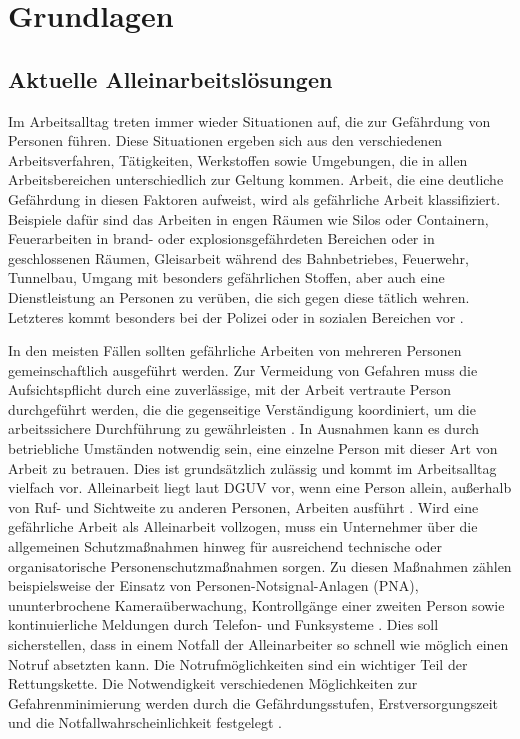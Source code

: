\documentclass[thesis.tex]{subfiles}
\begin{document}
\chapter{Grundlagen}\label{chap:grundlagen}

\section{Aktuelle Alleinarbeitslösungen}\label{chap:alleinarbeit}

Im Arbeitsalltag treten immer wieder Situationen auf, die zur Gefährdung von Personen führen.
Diese Situationen ergeben sich aus den verschiedenen Arbeitsverfahren, Tätigkeiten, Werkstoffen sowie Umgebungen, die in allen Arbeitsbereichen unterschiedlich zur Geltung kommen.
Arbeit, die eine deutliche Gefährdung in diesen Faktoren aufweist, wird als gefährliche Arbeit klassifiziert.
Beispiele dafür sind das Arbeiten in engen Räumen wie Silos oder Containern, Feuerarbeiten in brand- oder explosionsgefährdeten Bereichen oder in geschlossenen Räumen, Gleisarbeit während des Bahnbetriebes, Feuerwehr, Tunnelbau, Umgang mit besonders gefährlichen Stoffen, aber auch eine Dienstleistung an Personen zu verüben, die sich gegen diese tätlich wehren.
Letzteres kommt besonders bei der Polizei oder in sozialen Bereichen vor \cite[vgl.~S.~41 2.7.1][]{Regel_100-001}.

In den meisten Fällen sollten gefährliche Arbeiten von mehreren Personen gemeinschaftlich ausgeführt werden.
Zur Vermeidung von Gefahren muss die Aufsichtspflicht durch eine zuverlässige, mit der Arbeit vertraute Person durchgeführt werden, die die gegenseitige Verständigung koordiniert, um die arbeitssichere Durchführung zu gewährleisten \cite[vgl.~§~8.1][]{Vorschrift1_DGUV}.
In Ausnahmen kann es durch betriebliche Umständen notwendig sein, eine einzelne Person mit dieser Art von Arbeit zu betrauen. Dies ist grundsätzlich zulässig und kommt im Arbeitsalltag vielfach vor.
Alleinarbeit liegt laut DGUV vor, wenn eine Person allein, außerhalb von Ruf- und Sichtweite zu anderen Personen, Arbeiten ausführt \cite[S.~41~2.7.2][]{Regel_100-001}.
Wird eine gefährliche Arbeit als Alleinarbeit vollzogen, muss ein Unternehmer über die allgemeinen Schutzmaßnahmen hinweg für ausreichend technische oder organisatorische Personenschutzmaßnahmen sorgen.
Zu diesen Maßnahmen zählen beispielsweise der Einsatz von Personen-Notsignal-Anlagen (PNA), ununterbrochene Kameraüberwachung, Kontrollgänge einer zweiten Person sowie kontinuierliche Meldungen durch Telefon- und Funksysteme \cite[vgl.~S.~43~2.7.2][]{Regel_100-001}.
Dies soll sicherstellen, dass in einem Notfall der Alleinarbeiter so schnell wie möglich einen Notruf absetzten kann.
Die Notrufmöglichkeiten sind ein wichtiger Teil der Rettungskette.
Die Notwendigkeit verschiedenen Möglichkeiten zur Gefahrenminimierung werden durch die Gefährdungsstufen, Erstversorgungszeit und die Notfallwahrscheinlichkeit festgelegt \cite[vgl.~S.~13-18][]{Regel_112-139}.
\end{document}
